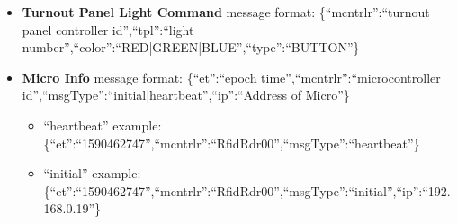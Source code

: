 \begin{itemize}
\begin{itemize}
\item example \{``mcntrlr'':``TrnCtlr01'',``to'':``1'',``cmd'':``CLOSE''\}
\end{itemize}
\item \textbf {Turnout Panel Light Command} message format: \{``mcntrlr'':``turnout panel controller id'',``tpl'':``light number'',``color'':``RED|GREEN|BLUE'',``type'':``BUTTON''\}
\item \textbf {Micro Info} message format: \{``et'':``epoch time'',``mcntrlr'':``microcontroller id'',``msgType'':``initial|heartbeat'',``ip'':``Address of Micro''\}
\begin{itemize}
\item ``heartbeat'' example: \{``et'':``1590462747'',``mcntrlr'':``RfidRdr00'',``msgType'':``heartbeat''\} 
\item ``initial'' example: \{``et'':``1590462747'',``mcntrlr'':``RfidRdr00'',``msgType'':``initial'',``ip'':``192.168.0.19''\}
\end{itemize}
\end{itemize}
